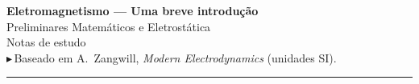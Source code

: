 \usepackage{xcolor}
\newcommand{\adereco}{\textcolor{coradd}{\ensuremath{\blacktriangleright}}} %
\newcommand{\add}[1]{\adereco\,\textcolor{coradd}{#1}}
\newenvironment{nota}
  {\par\nobreak\vspace{2pt}\noindent\adereco\ \bgroup\color{coradd}}
  {\ \textcolor{coradd}{$\blacktriangleleft$}\egroup\par\vspace{2pt}}

\setlength{\emergencystretch}{3em}

\usepackage{amsthm}
\usepackage[hidelinks]{hyperref}

\theoremstyle{definition}
\newtheorem{exemplo}{Exemplo}[section]
\theoremstyle{remark}
\newtheorem*{obs}{Observação}

\renewcommand{\vec}[1]{\bm{#1}}          %
\newcommand{\uvec}[1]{\hat{\bm{#1}}}     %
\newcommand{\grad}{\vec{\nabla}}
\newcommand{\dpar}[2]{\dfrac{\partial #1}{\partial #2}}
\newcommand{\rsep}{\bm{\mathcal{R}}}     %
\newcommand{\usep}{\hat{\bm{\mathcal{R}}}}
\newcommand{\Rsep}{\mathcal{R}}          %
\newcommand{\eps}{\varepsilon_{0}}



\begin{center}
  {\Large\bfseries Eletromagnetismo — Uma breve introdução}\\[4pt]
  {\large Preliminares Matemáticos e Eletrostática}\\[10pt]
  {\normalsize Notas de estudo}\\[2pt]
  \add{Baseado em A.~Zangwill, \textit{Modern Electrodynamics} (unidades SI).}\\[6pt]
  \rule{\textwidth}{0.4pt}
\end{center}

